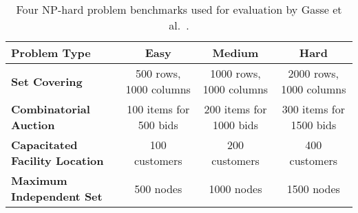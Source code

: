 \begin{table*}[htb!]
    \centering
    \begin{tabular}{|l c c c|}
        \hline
        \textbf{Problem Type} & \textbf{Easy} & \textbf{Medium} & \textbf{Hard}\\
        \hline
        \textbf{Set Covering~\cite{balasSetCoveringAlgorithms1980}} & 500 rows, 1000 columns & 1000 rows, 1000 columns & 2000 rows, 1000 columns\\
        \textbf{Combinatorial Auction~\cite{leyton-brownUniversalTestSuite2000}} & 100 items for 500 bids & 200 items for 1000 bids & 300 items for 1500 bids\\
        \textbf{Capacitated Facility Location~\cite{cornuejolsComparisonHeuristicsRelaxations1991}} & 100 customers & 200 customers & 400 customers\\
        \textbf{Maximum Independent Set~\cite{bergmanDecisionDiagramsOptimization2016}} & 500 nodes & 1000 nodes & 1500 nodes\\
        \hline
    \end{tabular}
    \caption{Four NP-hard problem benchmarks used for evaluation by Gasse et al.~\cite{gasseExactCombinatorialOptimization2019}.}
    \label{tab:gasse-benchmark-problems}
\end{table*}